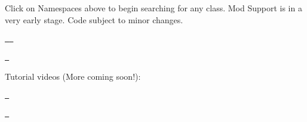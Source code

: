 \label{index_md_README}%
%
 Click on Namespaces above to begin searching for any class. Mod Support is in a very early stage. Code subject to minor changes.

\href{https://www.patreon.com/sgthale}{\texttt{ }}\href{https://www.subscribestar.com/viva-project}{\texttt{ }}

\href{https://discord.com/invite/ny28t5acEC}{\texttt{ }}

Tutorial videos (More coming soon!)\+:

\href{http://www.youtube.com/watch?v=eOqoGdcV5mc}{\texttt{ }}

\href{http://www.youtube.com/watch?v=Fc4COo1G96Y}{\texttt{ }} 